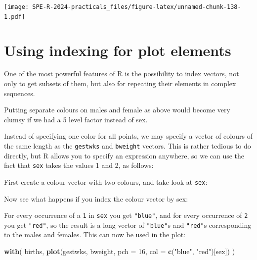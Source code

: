 \documentclass[
]{book}
\newenvironment{Shaded}{\begin{snugshade}}{\end{snugshade}}
\newcommand{\AttributeTok}[1]{\textcolor[rgb]{0.13,0.29,0.53}{#1}}
\newcommand{\DecValTok}[1]{\textcolor[rgb]{0.00,0.00,0.81}{#1}}
\newcommand{\FunctionTok}[1]{\textcolor[rgb]{0.13,0.29,0.53}{\textbf{#1}}}
\newcommand{\NormalTok}[1]{#1}
\newcommand{\SpecialCharTok}[1]{\textcolor[rgb]{0.81,0.36,0.00}{\textbf{#1}}}
\newcommand{\StringTok}[1]{\textcolor[rgb]{0.31,0.60,0.02}{#1}}
\begin{document}
\texttt{[image: SPE-R-2024-practicals\_files/figure-latex/unnamed-chunk-138-1.pdf]}

\section{Using indexing for plot elements}\label{using-indexing-for-plot-elements}

One of the most powerful features of R is the possibility to index
vectors, not only to get subsets of them, but also for repeating their
elements in complex sequences.

Putting separate colours on males and female as above would become
very clumsy if we had a 5 level factor instead of sex.

Instead of specifying one color for all points, we may specify a
vector of colours of the same length as the \texttt{gestwks} and
\texttt{bweight} vectors. This is rather tedious to do directly, but R
allows you to specify an expression anywhere, so we can use the fact
that \texttt{sex} takes the values 1 and 2, as follows:

First create a colour vector with two colours,
and take look at \texttt{sex}:

\begin{Shaded}
\end{Shaded}

Now see what happens if you index the colour vector by sex:

\begin{Shaded}
\end{Shaded}

For every occurrence of a \texttt{1} in \texttt{sex} you get
\texttt{"blue"}, and for every occurrence of \texttt{2} you get
\texttt{"red"}, so the result is a long vector of \texttt{"blue"}s and
\texttt{"red"}s corresponding to the males and females.
This can now be used in the plot:

\begin{Shaded}
\begin{Highlighting}[]
\FunctionTok{with}\NormalTok{(}
\NormalTok{  births, }
  \FunctionTok{plot}\NormalTok{(gestwks, bweight, }\AttributeTok{pch =} \DecValTok{16}\NormalTok{, }\AttributeTok{col =} \FunctionTok{c}\NormalTok{(}\StringTok{"blue"}\NormalTok{, }\StringTok{"red"}\NormalTok{)[sex])}
\NormalTok{)}
\end{Highlighting}
\end{Shaded}
\end{document}
